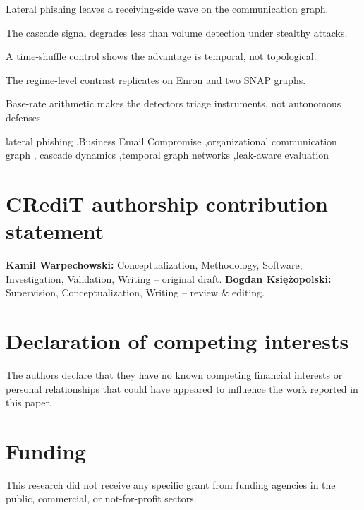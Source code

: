 \documentclass[a4paper,fleqn]{cas-sc}
\begin{document}
\begin{highlights}
\item Lateral phishing leaves a receiving-side wave on the communication graph.
\item The cascade signal degrades less than volume detection under stealthy attacks.
\item A time-shuffle control shows the advantage is temporal, not topological.
\item The regime-level contrast replicates on Enron and two SNAP graphs.
\item Base-rate arithmetic makes the detectors triage instruments, not autonomous defenses.
\end{highlights}

\begin{keywords}
lateral phishing \sep Business Email Compromise \sep organizational communication graph \sep
cascade dynamics \sep temporal graph networks \sep leak-aware evaluation
\end{keywords}

\maketitle









\section*{CRediT authorship contribution statement}
\textbf{Kamil Warpechowski:} Conceptualization, Methodology, Software, Investigation, Validation,
Writing -- original draft. \textbf{Bogdan Ksi{\k{e}}{\.z}opolski:} Supervision, Conceptualization,
Writing -- review \& editing.

\section*{Declaration of competing interests}
The authors declare that they have no known competing financial interests or personal relationships
that could have appeared to influence the work reported in this paper.

\section*{Funding}
This research did not receive any specific grant from funding agencies in the public, commercial,
or not-for-profit sectors.
\end{document}
